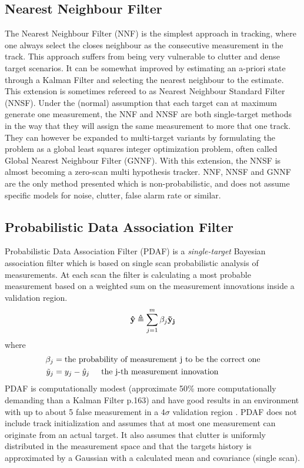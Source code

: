 \subsection{Nearest Neighbour Filter}
The Nearest Neighbour Filter (NNF) is the simplest approach in tracking, where one always select the closes neighbour as the consecutive measurement in the track. This approach suffers from being very vulnerable to clutter and dense target scenarios. It can be somewhat improved by estimating an a-priori state through a Kalman Filter and selecting the nearest neighbour to the estimate. This extension is sometimes refereed to as Nearest Neighbour Standard Filter (NNSF). Under the (normal) assumption that each target can at maximum generate one measurement, the NNF and NNSF are both single-target methods in the way that they will assign the same measurement to more that one track. They can however be expanded to multi-target variants by formulating the problem as a global least squares integer optimization problem, often called Global Nearest Neighbour Filter (GNNF). With this extension, the NNSF is almost becoming a zero-scan multi hypothesis tracker. NNF, NNSF and GNNF are the only method presented which is non-probabilistic, and does not assume specific models for noise, clutter, false alarm rate or similar.

\subsection{Probabilistic Data Association Filter}
Probabilistic Data Association Filter (PDAF) is a \emph{single-target} Bayesian association filter which is based on single scan probabilistic analysis of measurements. At each scan the filter is calculating a most probable measurement based on a weighted sum on the measurement innovations inside a validation region.
\begin{equation}
\boldsymbol{\mathbf{\hat{y}}} \triangleq \sum\limits_{j=1}^m \beta_j \boldsymbol{\mathbf{ \tilde{y}_j }}
\label{PDA_sum}
\end{equation} 
where
\begin{equation*}
\begin{split}
	\beta_j		&= \text{the probability of measurement j to be the correct one} \\
	\tilde{y}_j &= y_j - \hat{y}_j \hspace{5mm}	\text{the j-th measurement innovation}
\end{split}
\end{equation*}
PDAF is computationally modest (approximate 50\% more computationally demanding than a Kalman Filter \cite{Bar-Shalom1998} p.163) and have good results in an environment with up to about 5 false measurement in a $4\sigma$ validation region \cite{Bar-Shalom1998}. PDAF does not include track initialization and assumes that at most one measurement can originate from an actual target. It also assumes that clutter is uniformly distributed in the measurement space and that the targets history is approximated by a Gaussian with a calculated mean and covariance (single scan).

